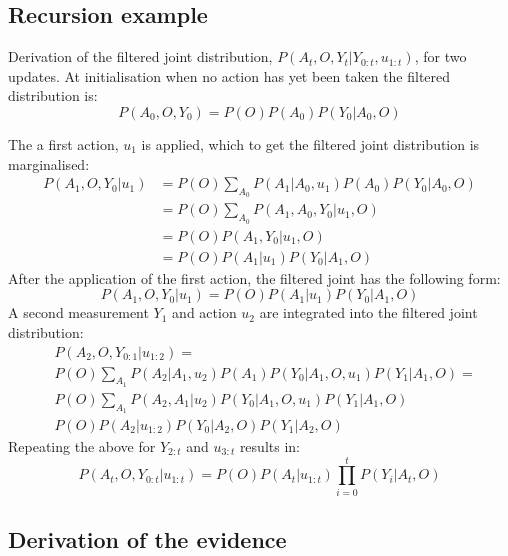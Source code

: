 \subsection{Recursion example}\label{appendix:recursion_example}

Derivation of the filtered joint distribution, $P(A_t,O,Y_t|Y_{0:t},u_{1:t})$, for 
two updates. At initialisation when no action has yet been taken the filtered distribution 
is:
\begin{equation}
  P(A_0,O,Y_0) = P(O) P(A_0) P(Y_0|A_0,O) 
\end{equation}
  
The a first action, $u_1$ is applied, which to get the filtered joint distribution is marginalised:
\begin{align}
  P(A_1,O,Y_0|u_1) &= P(O)\sum\limits_{A_0} P(A_1|A_0,u_1) P(A_0) P(Y_0|A_0,O)\\
                   &= P(O)\sum\limits_{A_0} P(A_1,A_0,Y_0|u_1,O)\\
                   &= P(O) P(A_1,Y_0|u_1,O)\\
                   &= P(O) P(A_1|u_1) P(Y_0|A_1,O)
\end{align} 
After the application of the first action, the filtered joint has the following form:
\begin{equation}
 P(A_1,O,Y_0|u_1) = P(O) P(A_1|u_1) P(Y_0|A_1,O)
\end{equation}
A second measurement $Y_1$ and action $u_2$ are integrated into the filtered joint distribution:
\begin{align}
 &P(A_2,O,Y_{0:1}|u_{1:2}) = \nonumber \\
 &P(O) \sum\limits_{A_1} P(A_2|A_1,u_2) P(A_1) P(Y_0|A_1,O,u_1) P(Y_1|A_1,O) = \\
 &P(O) \sum\limits_{A_1} P(A_2,A_1|u_2) P(Y_0|A_1,O,u_1) P(Y_1|A_1,O) \\
 &P(O) P(A_2|u_{1:2}) P(Y_0|A_2,O) P(Y_1|A_2,O)
\end{align}
Repeating the above for $Y_{2:t}$ and $u_{3:t}$ results in:
\begin{equation}
 P(A_t,O,Y_{0:t}|u_{1:t}) = P(O)P(A_t|u_{1:t}) \prod_{i=0}^{t} P(Y_i|A_t,O)
\end{equation}



\subsection{Derivation of the evidence}\label{appendix:evidence}


